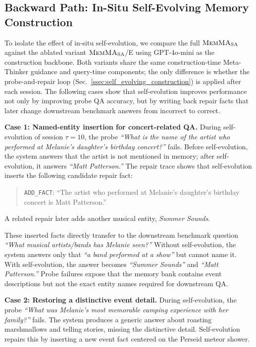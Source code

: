 \subsection{Backward Path: In-Situ Self-Evolving Memory Construction}
\label{appendix:case_backward}
To isolate the effect of in-situ self-evolution, we compare the full $\textnormal{\textsc{MemMA}}_{\mathrm{SA}}$ against the ablated variant $\textnormal{\textsc{MemMA}}_{\mathrm{SA}}$/E using GPT-4o-mini as the construction backbone.
Both variants share the same construction-time Meta-Thinker guidance and query-time components; the only difference is whether the probe-and-repair loop (Sec.~\ref{ssec:self_evolving_construction}) is applied after each session.
The following cases show that self-evolution improves performance not only by improving probe QA accuracy, but by writing back repair facts that later change downstream benchmark answers from incorrect to correct.

\noindent\textbf{Case 1: Named-entity insertion for concert-related QA.}
During self-evolution of session $\tau{=}10$, the probe \emph{``What is the name of the artist who performed at Melanie's daughter's birthday concert?''} fails.
Before self-evolution, the system answers that the artist is not mentioned in memory; after self-evolution, it answers \emph{``Matt Patterson.''}
The repair trace shows that self-evolution inserts the following candidate repair fact:
\begin{quote}
\small
\texttt{ADD\_FACT}: ``The artist who performed at Melanie's daughter's birthday concert is Matt Patterson.''
\end{quote}
A related repair later adds another musical entity, \emph{Summer Sounds}.

These inserted facts directly transfer to the downstream benchmark question \emph{``What musical artists/bands has Melanie seen?''}
Without self-evolution, the system answers only that \emph{``a band performed at a show''} but cannot name it.
With self-evolution, the answer becomes \emph{``Summer Sounds''} and \emph{``Matt Patterson.''}
Probe failures expose that the memory bank contains event descriptions but not the exact entity names required for downstream QA.

\noindent\textbf{Case 2: Restoring a distinctive event detail.}
During self-evolution, the probe \emph{``What was Melanie's most memorable camping experience with her family?''} fails.
The system produces a generic answer about roasting marshmallows and telling stories, missing the distinctive detail.
Self-evolution repairs this by inserting a new event fact centered on the Perseid meteor shower.

